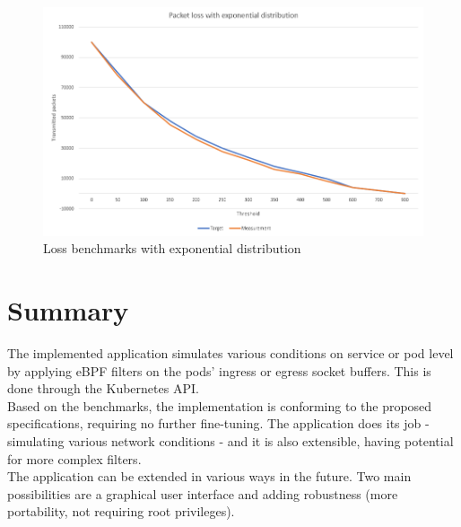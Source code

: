 \begin{figure}[H]
	\centering
	\includegraphics[width=\textwidth]{images/loss2.png}
	\caption{Loss benchmarks with exponential distribution}
	\label{fig:lossbench2}
\end{figure}


\chapter{Summary}

The implemented application simulates various conditions on service or pod level by applying eBPF filters on the pods' ingress or egress socket buffers. This is done through the Kubernetes API. \\

Based on the benchmarks, the implementation is conforming to the proposed specifications, requiring no further fine-tuning. The application does its job - simulating various network conditions - and it is also extensible, having potential for more complex filters. \\

The application can be extended in various ways in the future. Two main possibilities are a graphical user interface and adding robustness (more portability, not requiring root privileges).
